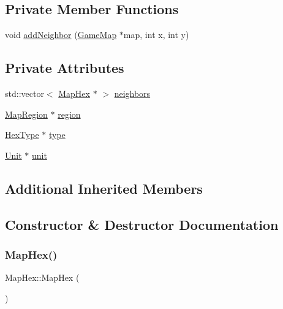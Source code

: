 \subsection*{Private Member Functions}
\begin{DoxyCompactItemize}
\item 
void \hyperlink{class_map_hex_ab48b0a671613382e07a58917e8634797}{add\+Neighbor} (\hyperlink{class_game_map}{Game\+Map} $\ast$map, int x, int y)
\end{DoxyCompactItemize}
\subsection*{Private Attributes}
\begin{DoxyCompactItemize}
\item 
std\+::vector$<$ \hyperlink{class_map_hex}{Map\+Hex} $\ast$ $>$ \hyperlink{class_map_hex_aa33e24590b6c9e6367874d6bc503cc32}{neighbors}
\item 
\hyperlink{class_map_region}{Map\+Region} $\ast$ \hyperlink{class_map_hex_a717a676e9a80b8e476dc4b75c45c7645}{region}
\item 
\hyperlink{class_hex_type}{Hex\+Type} $\ast$ \hyperlink{class_map_hex_acdc5f2afda9662cee5cd861d2ea98111}{type}
\item 
\hyperlink{class_unit}{Unit} $\ast$ \hyperlink{class_map_hex_ac828a1134dad20ed68d04924212467ed}{unit}
\end{DoxyCompactItemize}
\subsection*{Additional Inherited Members}


\subsection{Constructor \& Destructor Documentation}
\mbox{\label{class_map_hex_a9fc6f3220be1d449d10011eb1092043b}} 
\subsubsection{\texorpdfstring{Map\+Hex()}{MapHex()}\hspace{0.1cm}{\footnotesize\ttfamily [1/2]}}
{\footnotesize\ttfamily Map\+Hex\+::\+Map\+Hex (\begin{DoxyParamCaption}{ }\end{DoxyParamCaption})}

